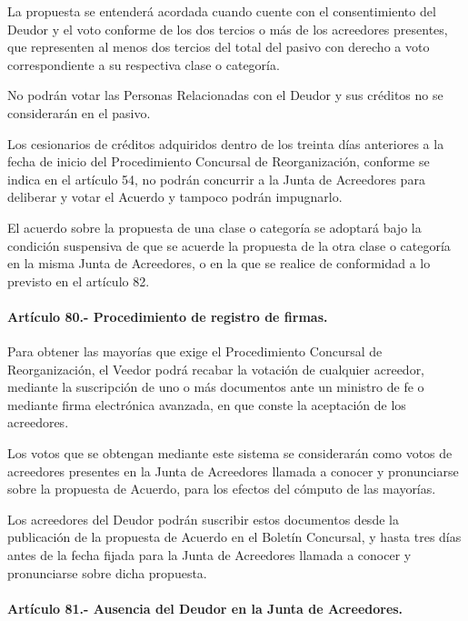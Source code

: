 \documentclass[
]{book}
\begin{document}
La propuesta se entenderá acordada cuando cuente con el consentimiento del Deudor y el voto conforme de los dos tercios o más de los acreedores presentes, que representen al menos dos tercios del total del pasivo con derecho a voto correspondiente a su respectiva clase o categoría.

No podrán votar las Personas Relacionadas con el Deudor y sus créditos no se considerarán en el pasivo.

Los cesionarios de créditos adquiridos dentro de los treinta días anteriores a la fecha de inicio del Procedimiento Concursal de Reorganización, conforme se indica en el artículo 54, no podrán concurrir a la Junta de Acreedores para deliberar y votar el Acuerdo y tampoco podrán impugnarlo.

El acuerdo sobre la propuesta de una clase o categoría se adoptará bajo la condición suspensiva de que se acuerde la propuesta de la otra clase o categoría en la misma Junta de Acreedores, o en la que se realice de conformidad a lo previsto en el artículo 82.

\hypertarget{artuxedculo-80.--procedimiento-de-registro-de-firmas.}{%
\paragraph*{Artículo 80.- Procedimiento de registro de firmas.}\label{artuxedculo-80.--procedimiento-de-registro-de-firmas.}}

Para obtener las mayorías que exige el Procedimiento Concursal de Reorganización, el Veedor podrá recabar la votación de cualquier acreedor, mediante la suscripción de uno o más documentos ante un ministro de fe o mediante firma electrónica avanzada, en que conste la aceptación de los acreedores.

Los votos que se obtengan mediante este sistema se considerarán como votos de acreedores presentes en la Junta de Acreedores llamada a conocer y pronunciarse sobre la propuesta de Acuerdo, para los efectos del cómputo de las mayorías.

Los acreedores del Deudor podrán suscribir estos documentos desde la publicación de la propuesta de Acuerdo en el Boletín Concursal, y hasta tres días antes de la fecha fijada para la Junta de Acreedores llamada a conocer y pronunciarse sobre dicha propuesta.

\hypertarget{artuxedculo-81.--ausencia-del-deudor-en-la-junta-de-acreedores.}{%
\paragraph*{Artículo 81.- Ausencia del Deudor en la Junta de Acreedores.}\label{artuxedculo-81.--ausencia-del-deudor-en-la-junta-de-acreedores.}}
\end{document}
